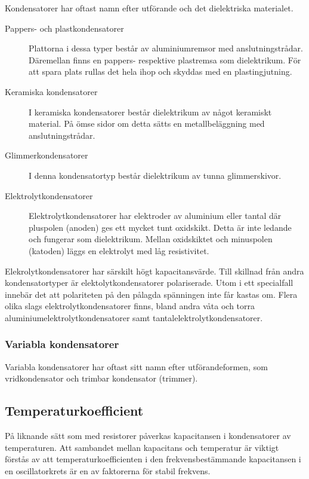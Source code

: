Kondensatorer har oftast namn efter utförande och det dielektriska materialet.
\begin{description}
\item[Pappers- och plastkondensatorer]
Plattorna i dessa typer består av aluminiumremsor med anslutningstrådar.
Däremellan finns en pap\-pe\-rs- re\-spe\-k\-ti\-ve plastremsa som dielektrikum.
För att spara plats rullas det hela ihop och skyddas med en plastingjutning.

\item[Keramiska kondensatorer]
I keramiska kondensatorer består dielektrikum av något keramiskt material.
På ömse sidor om detta sätts en metallbeläggning med anslutningstrådar.

\item[Glimmerkondensatorer]
I denna kondensatortyp består dielektrikum av tunna glimmerskivor.

\item[Elektrolytkondensatorer]
Elektrolytkondensatorer har elektroder av aluminium eller tantal där pluspolen
(anoden) ges ett mycket tunt oxidskikt.
Detta är inte ledande och fungerar som dielektrikum.
Mellan oxidskiktet och minuspolen (katoden) läggs en elektrolyt med låg
resistivitet.
\end{description}

\noindent
Elekrolytkondensatorer har särskilt högt kapacitansvärde. Till skillnad från
andra kondensatortyper är elektolytkondensatorer polariserade. Utom i ett
specialfall innebär det att polariteten på den pålagda spänningen inte får
kastas om.
Flera olika slags elektrolytkondensatorer finns, bland andra våta och torra
aluminiumelektrolytkondensatorer samt tantalelektrolytkondensatorer.

\subsubsection{Variabla kondensatorer}
Variabla kondensatorer har oftast sitt namn efter utförandeformen, som
vridkondensator och trimbar kondensator (trimmer).

\subsection{Temperaturkoefficient}

På liknande sätt som med resistorer påverkas kapacitansen i kondensatorer av
temperaturen.
Att sambandet mellan kapacitans och temperatur är viktigt förstås av att
temperaturkoefficienten i den frekvensbestämmande kapacitansen i en
oscillatorkrets är en av faktorerna för stabil frekvens.

